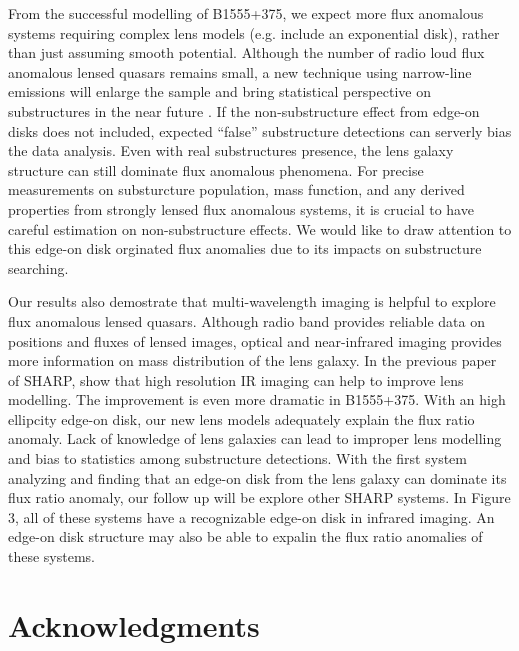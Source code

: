 \documentclass[useAMS,usenatbib]{mn2e}
\begin{document}
From the successful modelling of B1555+375,  we expect more flux anomalous systems requiring complex lens models (e.g. include an exponential disk), rather than just assuming smooth potential. Although the number of radio loud flux anomalous lensed quasars remains small, a new technique using narrow-line emissions will enlarge the sample and bring statistical perspective on substructures in the near future \citep{N14}. If the non-substructure effect from edge-on disks does not included, expected ``false'' substructure detections can serverly bias the data analysis. Even with real substructures presence, the lens galaxy structure can still dominate flux anomalous phenomena. For precise measurements on substurcture population, mass function, and any derived properties from strongly lensed flux anomalous systems, it is crucial to have careful estimation on non-substructure effects. We would like to draw attention to this edge-on disk orginated flux anomalies due to its impacts on substructure searching.

Our results also demostrate that multi-wavelength imaging is helpful to explore flux anomalous lensed quasars. Although radio band provides reliable data on positions and fluxes of lensed images, optical and near-infrared imaging provides more information on mass distribution of the lens galaxy. In the previous paper of SHARP, \citet{SHARP12} show that high resolution IR imaging can help to improve lens modelling. The improvement is even more dramatic in B1555+375. With an high ellipcity edge-on disk, our new lens models adequately explain the flux ratio anomaly. Lack of knowledge of lens galaxies can lead to improper lens modelling and bias to statistics among substructure detections. With the first system analyzing and finding that an edge-on disk from the lens galaxy can dominate its flux ratio anomaly, our follow up will be explore other SHARP systems. In Figure 3, all of these systems have a recognizable edge-on disk in infrared imaging. An edge-on disk structure may also be able to expalin the flux ratio anomalies of these systems.\\
 

\section*{Acknowledgments}







\label{lastpage}
\end{document}
